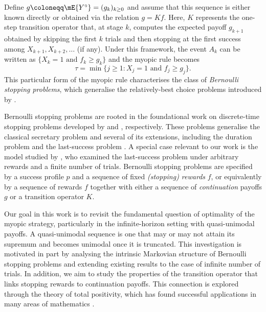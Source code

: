 \documentclass[11pt]{article}
\def\eL{K}
\begin{document}
	Define $g \coloneqq \mE{Y^\circ} =(g_k)_{k \ge 0}$ and assume that this sequence is either known directly or obtained via the relation $g= \eL f$. Here, 	$\eL$ represents the one-step transition operator that, at stage $k$, computes the expected payoff $g_{k+1}$ obtained by skipping the first $k$ trials and then stopping at the first success among $X_{k+1},X_{k+2}, \ldots$ (if any).   Under this framework,  the event $A_k$ can be written as $\{ X_k=1 \text{ and } f_k \ge g_{k} \}$ and the myopic rule becomes%
	\begin{equation}\label{ch1.def.ola.rule}
		\tau = \min\{ j \ge 1: X_j=1 \text { and }  f_j \ge g_{j} \}.
	\end{equation}
	This particular form of the myopic rule characterises	 the class of \textit{Bernoulli stopping problems}, which generalise the relatively-best choice problems introduced by \cite{FergusonHardwick}. 
	
	
	Bernoulli stopping problems are rooted in the foundational work on discrete-time stopping problems developed by \cite{Dynkin}  and \cite{FergusonBook}, respectively. These problems generalise the classical secretary problem and several of its extensions, including the duration problem \cite{FergusonHardwick} and the last-success problem  \cite{GD2}. A special case relevant  to our work is the model studied by  \cite{Ribas2019}, who examined the last-success problem under arbitrary rewards and a finite number of trials.  Bernoulli stopping problems are specified by a success profile $p$ and a sequence of fixed  \textit{(stopping) rewards} $f$, or equivalently by  a  sequence of {rewards} $f$  together with either a sequence of  \textit{continuation} payoffs $g$ or  a transition operator $\eL$. 
	
	Our goal in this work is to revisit the fundamental question of optimality of the myopic strategy, particularly  in the infinite-horizon setting with quasi-unimodal payoffs. A quasi-unimodal sequence is one that may or may not attain its supremum and becomes unimodal once it is  truncated. This investigation is  motivated in part by analysing the intrinsic Markovian structure of Bernoulli stopping problems and extending existing results to the case of infinite number of trials. In addition, we aim to study the properties of the transition operator that links stopping rewards to continuation payoffs. This connection is explored through the theory of total positivity, which has found successful applications in many areas of mathematics \cite{KarlinTPBook}.
	
\end{document}
